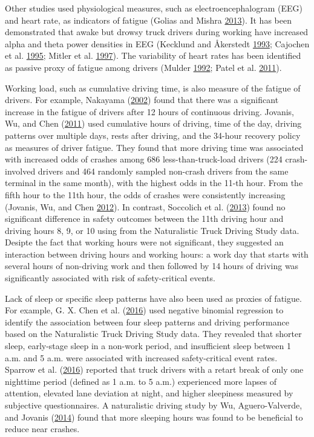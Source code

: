 \documentclass[12pt]{book}
\numberwithin{equation}{chapter}
\begin{document}
Other studies used physiological measures, such as electroencephalogram (EEG) and heart rate, as indicators of fatigue (Golias and Mishra \protect\hyperlink{ref-golias2013evaluating}{2013}). It has been demonstrated that awake but drowsy truck drivers during working have increased alpha and theta power densities in EEG (Kecklund and Åkerstedt \protect\hyperlink{ref-kecklund1993sleepiness}{1993}; Cajochen et al. \protect\hyperlink{ref-cajochen1995power}{1995}; Mitler et al. \protect\hyperlink{ref-mitler1997sleep}{1997}). The variability of heart rates has been identified as passive proxy of fatigue among drivers (Mulder \protect\hyperlink{ref-mulder1992measurement}{1992}; Patel et al. \protect\hyperlink{ref-patel2011applying}{2011}).

Working load, such as cumulative driving time, is also measure of the fatigue of drivers. For example, Nakayama (\protect\hyperlink{ref-nakayama2002trial}{2002}) found that there was a significant increase in the fatigue of drivers after 12 hours of continuous driving. Jovanis, Wu, and Chen (\protect\hyperlink{ref-jovanis2011hours}{2011}) used cumulative hours of driving, time of the day, driving patterns over multiple days, rests after driving, and the 34-hour recovery policy as measures of driver fatigue. They found that more driving time was associated with increased odds of crashes among 686 less-than-truck-load drivers (224 crash-involved drivers and 464 randomly sampled non-crash drivers from the same terminal in the same month), with the highest odds in the 11-th hour. From the fifth hour to the 11th hour, the odds of crashes were consistently increasing (Jovanis, Wu, and Chen \protect\hyperlink{ref-jovanis2012effects}{2012}). In contrast, Soccolich et al. (\protect\hyperlink{ref-soccolich2013analysis}{2013}) found no significant difference in safety outcomes between the 11th driving hour and driving hours 8, 9, or 10 using from the Naturalistic Truck Driving Study data. Desipte the fact that working hours were not significant, they suggested an interaction between driving hours and working hours: a work day that starts with several hours of non-driving work and then followed by 14 hours of driving was significantly associated with risk of safety-critical events.

Lack of sleep or specific sleep patterns have also been used as proxies of fatigue. For example, G. X. Chen et al. (\protect\hyperlink{ref-chen2016influence}{2016}) used negative binomial regression to identify the association between four sleep patterns and driving performance based on the Naturalistic Truck Driving Study data. They revealed that shorter sleep, early-stage sleep in a non-work period, and insufficient sleep between 1 a.m. and 5 a.m. were associated with increased safety-critical event rates. Sparrow et al. (\protect\hyperlink{ref-sparrow2016naturalistic}{2016}) reported that truck drivers with a retart break of only one nighttime period (defined as 1 a.m. to 5 a.m.) experienced more lapses of attention, elevated lane deviation at night, and higher sleepiness measured by subjective questionnaires. A naturalistic driving study by Wu, Aguero-Valverde, and Jovanis (\protect\hyperlink{ref-wu2014using}{2014}) found that more sleeping hours was found to be beneficial to reduce near crashes.
\end{document}
